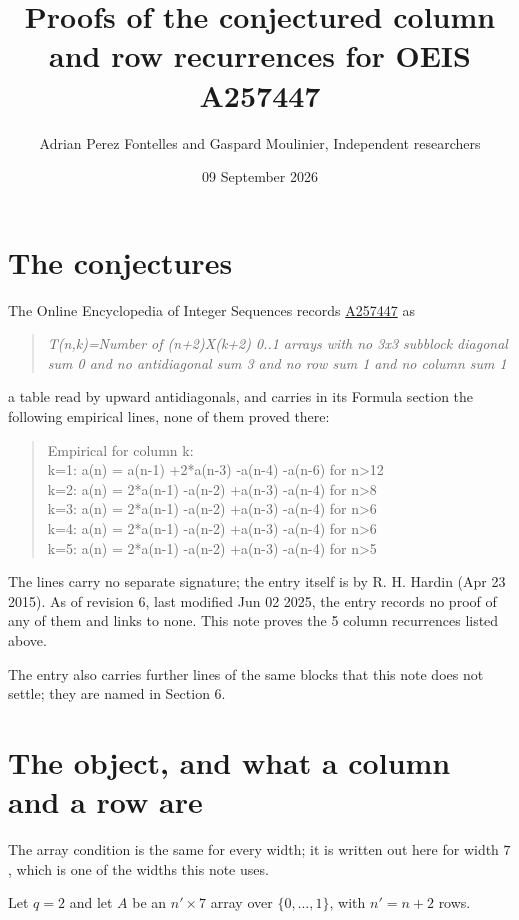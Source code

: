 \documentclass[11pt]{article}
\title{Proofs of the conjectured column and row recurrences for OEIS A257447}
\author{Adrian Perez Fontelles and Gaspard Moulinier, Independent researchers}
\date{09 September 2026}
\theoremstyle{definition}
\begin{document}
\maketitle
\section{The conjectures}

The Online Encyclopedia of Integer Sequences records \href{https://oeis.org/A257447}{A257447} as

\begin{quote}\itshape T(n,k)=Number of (n+2)X(k+2) 0..1 arrays with no 3x3 subblock diagonal sum 0 and no antidiagonal sum 3 and no row sum 1 and no column sum 1\end{quote}

a table read by upward antidiagonals, and carries in its Formula section the following empirical lines, none of them proved there:

\begin{quote}\ttfamily Empirical for column k:\\
k=1: a(n) = a(n-1) +2*a(n-3) -a(n-4) -a(n-6) for n>12\\k=2: a(n) = 2*a(n-1) -a(n-2) +a(n-3) -a(n-4) for n>8\\k=3: a(n) = 2*a(n-1) -a(n-2) +a(n-3) -a(n-4) for n>6\\k=4: a(n) = 2*a(n-1) -a(n-2) +a(n-3) -a(n-4) for n>6\\k=5: a(n) = 2*a(n-1) -a(n-2) +a(n-3) -a(n-4) for n>5\end{quote}

The lines carry no separate signature; the entry itself is by R. H. Hardin (Apr 23 2015). As of revision 6, last modified Jun 02 2025, the entry records no proof of any of them and links to none. This note proves the 5 column recurrences listed above.

The entry also carries further lines of the same blocks that this note does not settle; they are named in Section 6.

\section{The object, and what a column and a row are}

The array condition is the same for every width; it is written out here for width $7$, which is one of the widths this note uses.

Let $q = 2$ and let $A$ be an $n' \times 7$ array over $\{0,\dots,1\}$, with $n' = n + 2$ rows.
\end{document}
